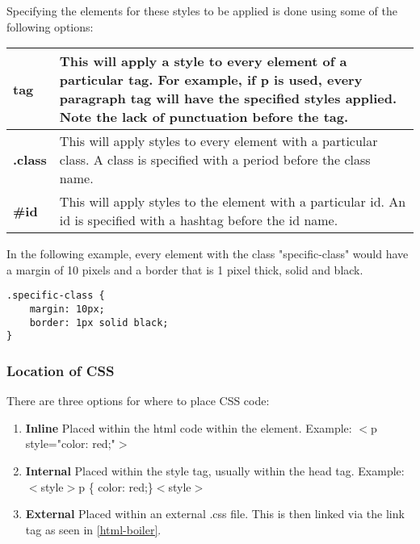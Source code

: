 \documentclass[portfolio.tex]{subfiles}
\begin{document}
			\vspace{0.5cm}
				Specifying the elements for these styles to be applied is done using some of the following options: \\


					\vspace{0.5cm}
					{\centering
						\begin{tabular}{P{4cm}p{11cm}}
							\toprule[1.5pt]
							\textbf{tag} & This will apply a style to every element of a particular tag. For example, if p is used, every paragraph tag will have the specified styles applied. Note the lack of punctuation before the tag. \\
							\midrule
							\textbf{.class} &  This will apply styles to every element with a particular class. A class is specified with a period before the class name. \\
							\midrule
							\textbf{\#id} &  This will apply styles to the element with a particular id. An id is specified with a hashtag before the id name. \\
							\bottomrule[1.5pt]
						\end{tabular}
					}

					\vspace{0.8cm}

					In the following example, every element with the class "specific-class" would have a margin of 10 pixels and a border that is 1 pixel thick, solid and black.\\

					\vspace{0.2cm}
					\begin{lstlisting}
.specific-class {
	margin: 10px;
	border: 1px solid black;
}
					\end{lstlisting}
					\vspace{0.2cm}

				\subsubsection{Location of CSS}
					There are three options for where to place CSS code:\\

					\begin{enumerate}
						\item \textbf{Inline}
							Placed within the html code within the element. Example: $<$p style="color: red;"$>$
						\item \textbf{Internal}
							Placed within the style tag, usually within the head tag. Example:  $<$style$>$p \{ color: red;\}$<$style$>$
						\item \textbf{External}
							Placed within an external .css file. This is then linked via the link tag as seen in \ref{html-boiler}.
					\end{enumerate}
\end{document}
